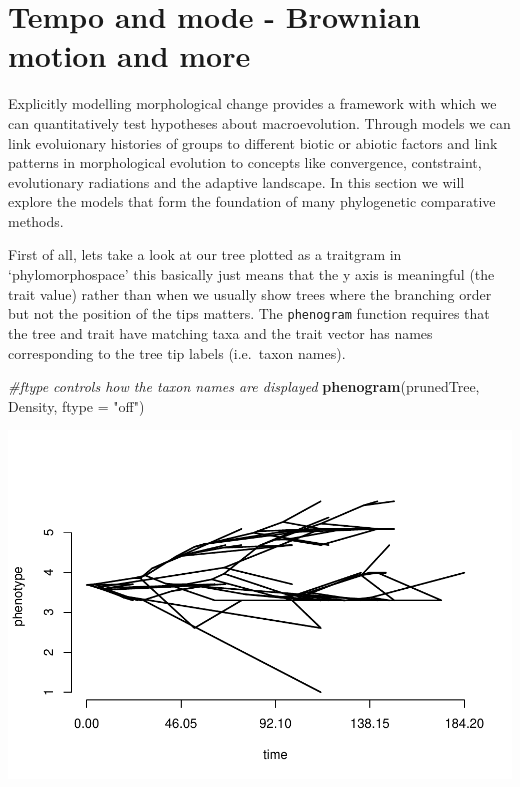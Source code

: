 \documentclass[]{article}
\newenvironment{Shaded}{\begin{snugshade}}{\end{snugshade}}
\newcommand{\KeywordTok}[1]{\textcolor[rgb]{0.13,0.29,0.53}{\textbf{#1}}}
\newcommand{\DataTypeTok}[1]{\textcolor[rgb]{0.13,0.29,0.53}{#1}}
\newcommand{\StringTok}[1]{\textcolor[rgb]{0.31,0.60,0.02}{#1}}
\newcommand{\CommentTok}[1]{\textcolor[rgb]{0.56,0.35,0.01}{\textit{#1}}}
\newcommand{\NormalTok}[1]{#1}
\begin{document}
\section{Tempo and mode - Brownian motion and
more}\label{tempo-and-mode---brownian-motion-and-more}

Explicitly modelling morphological change provides a framework with
which we can quantitatively test hypotheses about macroevolution.
Through models we can link evoluionary histories of groups to different
biotic or abiotic factors and link patterns in morphological evolution
to concepts like convergence, contstraint, evolutionary radiations and
the adaptive landscape. In this section we will explore the models that
form the foundation of many phylogenetic comparative methods.

First of all, lets take a look at our tree plotted as a traitgram in
`phylomorphospace' this basically just means that the y axis is
meaningful (the trait value) rather than when we usually show trees
where the branching order but not the position of the tips matters. The
\texttt{phenogram} function requires that the tree and trait have
matching taxa and the trait vector has names corresponding to the tree
tip labels (i.e.~taxon names).

\begin{Shaded}
\begin{Highlighting}[]
\CommentTok{#ftype controls how the taxon names are displayed}
\KeywordTok{phenogram}\NormalTok{(prunedTree, Density, }\DataTypeTok{ftype =} \StringTok{"off"}\NormalTok{) }
\end{Highlighting}
\end{Shaded}

\includegraphics{module_08_files/figure-latex/unnamed-chunk-15-1.pdf}
\end{document}
